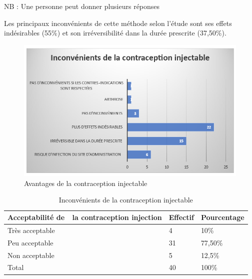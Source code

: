\noindent NB : Une personne peut donner plusieurs réponses

\vspace{2em}

\noindent Les principaux inconvénients de cette méthode selon l’étude sont ses effets indésirables (55\%) et son irréversibilité dans la durée prescrite (37,50\%). 

\begin{figure}[H]
  \centering
  \includegraphics[scale=1.1]{Images/fig_51.png}
  \caption{Avantages de la contraception injectable}  
\end{figure}

\begin{table}[H]
  \centering
  \renewcommand{\arraystretch}{1.5}
  \caption{Inconvénients de la contraception injectable}
  \begin{spacing}{1.5} %
  \begin{tabularx}{\textwidth}{|p{8cm}|X|X|}
      \hline
      \rowcolor{customcolor}
      \textbf{\color{white}Acceptabilité \hspace{1cm} de \,\, la  \newline contraception injection} & \textbf{\color{white}Effectif} & \textbf{\color{white}Pourcentage}  \\
      \hline
      Très acceptable & 4 & 10\% \\
      \hline
      Peu acceptable  & 31 & 77,50\% \\
      \hline
      Non acceptable & 5 & 12,5\% \\
      \hline
      Total & 40 & 100\% \\
      
      \hline
  \end{tabularx}
\end{spacing}

\end{table}

